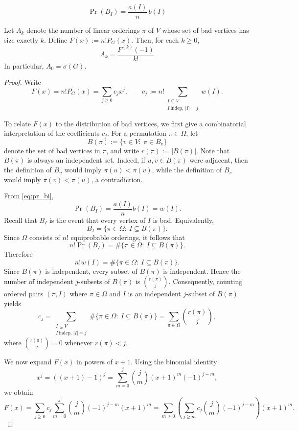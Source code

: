 \documentclass[10pt,a4paper]{amsart}
\begin{document}
\begin{equation}
\label{eq:pr_bi}
\Pr(B_I)=\frac{a(I)}{n}\,b(I)
\end{equation}

\begin{theorem}\label{thm:derivative}
Let \(A_k\) denote the number of linear orderings \(\pi\) of \(V\) whose set of bad vertices has size exactly \(k\). Define \(F(x):=n!P_G(x)\). Then, for each \(k\ge0\),
\[
A_k=\frac{F^{(k)}(-1)}{k!}
\]
In particular, \(A_0=\sigma(G)\).
\end{theorem}

\begin{proof}
Write
\[
F(x)=n!P_G(x)=\sum_{j\ge0} c_j x^j,
\qquad
c_j:=n!\sum_{\substack{I\subseteq V\\ I\ \mathrm{indep},\,|I|=j}} w(I).
\]

To relate \(F(x)\) to the distribution of bad vertices, we first give a combinatorial interpretation of the coefficients \(c_j\).
For a permutation \(\pi\in\Omega\), let
\[
B(\pi):=\{v\in V:\ \pi\in B_v\}
\]
denote the set of bad vertices in \(\pi\), and write
\(
r(\pi):=|B(\pi)|.
\)
Note that \(B(\pi)\) is always an independent set. Indeed, if
\(u,v\in B(\pi)\) were adjacent, then the definition of \(B_u\)
would imply \(\pi(u)<\pi(v)\), while the definition of \(B_v\)
would imply \(\pi(v)<\pi(u)\), a contradiction.

From \eqref{eq:pr_bi},
\[
\Pr(B_I)=\frac{a(I)}{n}b(I)=w(I).
\]
Recall that \(B_I\) is the event that every vertex of \(I\) is bad. Equivalently,
\[
B_I=\{\pi\in\Omega:\ I\subseteq B(\pi)\}.
\]
Since \(\Omega\) consists of \(n!\) equiprobable orderings, it follows that
\[
n!\Pr(B_I)
=
\#\{\pi\in\Omega:\ I\subseteq B(\pi)\}.
\]
Therefore
\[
n!w(I)
=
\#\{\pi\in\Omega:\ I\subseteq B(\pi)\}.
\]
Since \(B(\pi)\) is independent, every subset of \(B(\pi)\) is independent. Hence the number of independent \(j\)-subsets of \(B(\pi)\) is \(\binom{r(\pi)}{j}\).
Consequently, counting ordered pairs \((\pi,I)\) where
\(\pi\in\Omega\) and \(I\) is an independent \(j\)-subset of
\(B(\pi)\) yields
\begin{equation}\label{eq:cj-sum}
c_j
=
\sum_{\substack{I\subseteq V\\ I\ \mathrm{indep},\,|I|=j}}
\#\{\pi\in\Omega:\ I\subseteq B(\pi)\}
=
\sum_{\pi\in\Omega}\binom{r(\pi)}{j},
\end{equation}
where \(\binom{r(\pi)}{j}=0\) whenever \(r(\pi)<j\).

We now expand \(F(x)\) in powers of \(x+1\). Using the binomial identity
\[
x^j=((x+1)-1)^j
=
\sum_{m=0}^{j}
\binom{j}{m}
(x+1)^m
(-1)^{j-m},
\]
we obtain
\[
F(x)
=
\sum_{j\ge0}
c_j
\sum_{m=0}^{j}
\binom{j}{m}
(-1)^{j-m}
(x+1)^m
=
\sum_{m\ge0}
\left(
\sum_{j\ge m}
c_j
\binom{j}{m}
(-1)^{j-m}
\right)
(x+1)^m.
\]


\end{proof}
\end{document}
